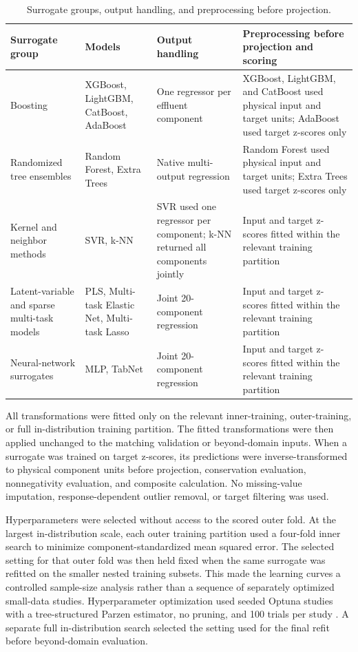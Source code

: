 \documentclass[12pt, twoside]{book}
\begin{document}
\begin{table}[htbp]
\centering
\caption{Surrogate groups, output handling, and preprocessing before projection.}
\label{tab:ch2_surrogate_projection_protocol}
\scriptsize
\setlength{\tabcolsep}{3pt}
\begin{tabular}{>{\raggedright\arraybackslash}p{2.8cm}>{\raggedright\arraybackslash}p{3.7cm}>{\raggedright\arraybackslash}p{3.0cm}>{\raggedright\arraybackslash}p{3.8cm}}
\toprule
Surrogate group & Models & Output handling & Preprocessing before projection and scoring \\
\midrule
Boosting & XGBoost, LightGBM, CatBoost, AdaBoost & One regressor per effluent component & XGBoost, LightGBM, and CatBoost used physical input and target units; AdaBoost used target z-scores only \\
Randomized tree ensembles & Random Forest, Extra Trees & Native multi-output regression & Random Forest used physical input and target units; Extra Trees used target z-scores only \\
Kernel and neighbor methods & SVR, k-NN & SVR used one regressor per component; k-NN returned all components jointly & Input and target z-scores fitted within the relevant training partition \\
Latent-variable and sparse multi-task models & PLS, Multi-task Elastic Net, Multi-task Lasso & Joint 20-component regression & Input and target z-scores fitted within the relevant training partition \\
Neural-network surrogates & MLP, TabNet & Joint 20-component regression & Input and target z-scores fitted within the relevant training partition \\
\bottomrule
\end{tabular}
\end{table}

All transformations were fitted only on the relevant inner-training, outer-training, or full in-distribution
training partition. The fitted transformations were then applied unchanged to the matching validation or
beyond-domain inputs. When a surrogate was trained on target z-scores, its predictions were inverse-transformed
to physical component units before projection, conservation evaluation, nonnegativity evaluation, and composite
calculation. No missing-value imputation, response-dependent outlier removal, or target filtering was used.

Hyperparameters were selected without access to the scored outer fold. At the largest in-distribution scale,
each outer training partition used a four-fold inner search to minimize component-standardized mean squared
error. The selected setting for that outer fold was then held fixed when the same surrogate was refitted on the
smaller nested training subsets. This made the learning curves a controlled sample-size analysis rather than a
sequence of separately optimized small-data studies. Hyperparameter optimization used seeded Optuna studies
with a tree-structured Parzen estimator, no pruning, and 100 trials per study \citep{Akiba2019}. A separate
full in-distribution search selected the setting used for the final refit before beyond-domain evaluation.
\end{document}
